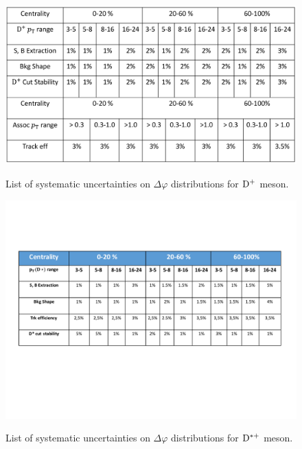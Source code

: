 \begin{figure}
\centering
{\includegraphics[width=0.95\linewidth]{Centrality_DPlus/Dplus/Dplus_Systematic_Centrality.png}}
\caption{List of systematic uncertainties on $\Delta\varphi$ distributions for ${\rm D^+}$ meson.}
\label{fig:TableSystDplus}
\end{figure}

\begin{figure}
\centering
{\includegraphics[width=0.95\linewidth]{figuresVsCent/Dstar/DstarSystematics_final.pdf}}
\caption{List of systematic uncertainties on $\Delta\varphi$ distributions for ${\rm D^{*+}}$ meson.}
\label{fig:TableSystDstar}
\end{figure}


